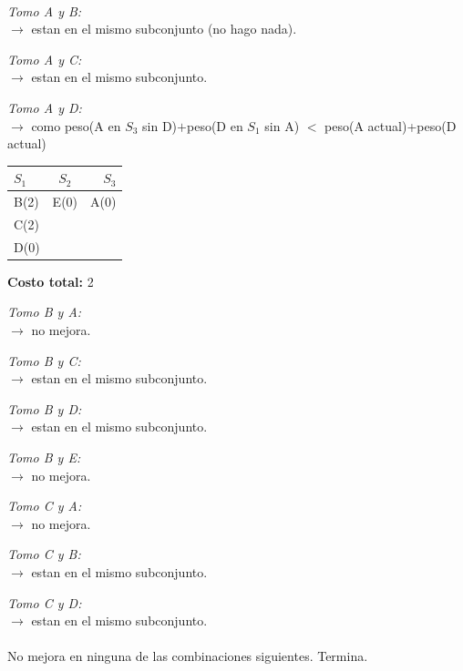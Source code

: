 \vrule
\begin{minipage}[t]{0.5\linewidth}
    \\
    \raggedright{
        \textit{Tomo A y B:}\\
        $\rightarrow$ estan en el mismo subconjunto (no hago nada).
    }\\
    \raggedright{
        \textit{Tomo A y C:}\\
        $\rightarrow$ estan en el mismo subconjunto.
    }\\
    \raggedright{
        \textit{Tomo A y D:}\\
        $\rightarrow$ como peso(A en $S_{3}$ sin D)$+$peso(D en $S_{1}$ sin A) $<$ peso(A actual)+peso(D actual)
    }\\
    \begin{center}
      \begin{tabular}{ l | c | r }
        $S_{1}$ & $S_{2}$ & $S_{3}$ \\ \hline
        B(2) & E(0) & A(0) \\
        C(2) &  &  \\
        D(0) &  &  \\
      \end{tabular}
      \textbf{Costo total:} 2
    \end{center}
    \raggedright{
        \textit{Tomo B y A:}\\
        $\rightarrow$ no mejora.
    }\\
    \raggedright{
        \textit{Tomo B y C:}\\
        $\rightarrow$ estan en el mismo subconjunto.
    }\\
    \raggedright{
        \textit{Tomo B y D:}\\
        $\rightarrow$ estan en el mismo subconjunto.
    }\\
    \raggedright{
        \textit{Tomo B y E:}\\
        $\rightarrow$ no mejora.
    }\\
    \raggedright{
        \textit{Tomo C y A:}\\
        $\rightarrow$ no mejora.
    }\\
    \raggedright{
        \textit{Tomo C y B:}\\
        $\rightarrow$ estan en el mismo subconjunto.
    }\\
    \raggedright{
        \textit{Tomo C y D:}\\
        $\rightarrow$ estan en el mismo subconjunto.
    }\\
    \\
    No mejora en ninguna de las combinaciones siguientes.
    Termina.


\end{minipage}


